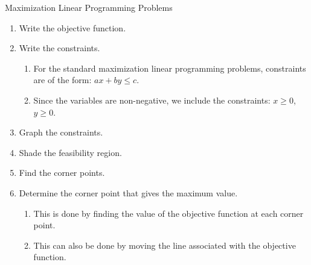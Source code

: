 \begin{summarybox}{Maximization Linear Programming Problems}
    \begin{enumerate}
        \item Write the objective function.
        \item Write the constraints.
              \begin{enumerate}
                  \item For the standard maximization linear programming problems, constraints are of the form: $ax + by \leq c$.
                  \item Since the variables are non-negative, we include the constraints: $x \geq 0$, $y \geq 0$.
              \end{enumerate}
        \item Graph the constraints.
        \item Shade the feasibility region.
        \item Find the corner points.
        \item Determine the corner point that gives the maximum value.
              \begin{enumerate}
                  \item This is done by finding the value of the objective function at each corner point.
                  \item This can also be done by moving the line associated with the objective function.
              \end{enumerate}
    \end{enumerate}

\end{summarybox}